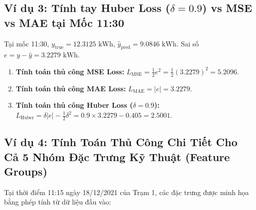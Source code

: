 \documentclass[12pt,a4paper]{article}
\begin{document}
\subsection{Ví dụ 3: Tính tay Huber Loss (\texorpdfstring{$\delta=0.9$}{delta=0.9}) vs MSE vs MAE tại Mốc 11:30}
Tại mốc 11:30, $y_{\text{true}} = 12.3125 \text{ kWh}$, $\hat{y}_{\text{pred}} = 9.0846 \text{ kWh}$. Sai số $e = y - \hat{y} = 3.2279 \text{ kWh}$.
\begin{enumerate}
    \item \textbf{Tính toán thủ công MSE Loss:} $L_{\text{MSE}} = \frac{1}{2} e^2 = \frac{1}{2} (3.2279)^2 = \mathbf{5.2096}$.
    \item \textbf{Tính toán thủ công MAE Loss:} $L_{\text{MAE}} = |e| = \mathbf{3.2279}$.
    \item \textbf{Tính toán thủ công Huber Loss ($\delta=0.9$):} $L_{\text{Huber}} = \delta |e| - \frac{1}{2}\delta^2 = 0.9 \times 3.2279 - 0.405 = \mathbf{2.5001}$.
\end{enumerate}

\subsection{Ví dụ 4: Tính Toán Thủ Công Chi Tiết Cho Cả 5 Nhóm Đặc Trưng Kỹ Thuật (Feature Groups)}
Tại thời điểm 11:15 ngày 18/12/2021 của Trạm 1, các đặc trưng được minh họa bằng phép tính từ dữ liệu đầu vào:
\end{document}
